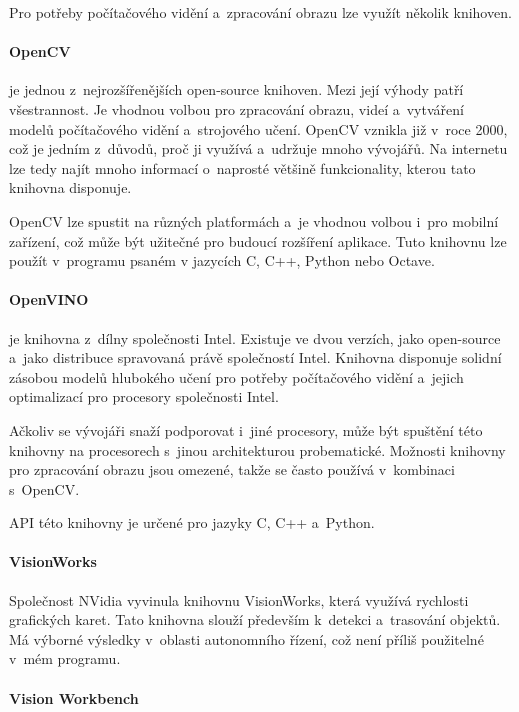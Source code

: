 Pro potřeby počítačového vidění a~zpracování obrazu lze využít několik knihoven.

\paragraph{OpenCV}

 \citep{OpenCV} je jednou z~nejrozšířenějších open-source knihoven. Mezi její výhody patří všestrannost. Je vhodnou volbou pro zpracování obrazu, videí a~vytváření modelů počítačového vidění a~strojového učení. OpenCV vznikla již v~roce 2000, což je jedním z~důvodů, proč ji využívá a~udržuje mnoho vývojářů. Na internetu lze tedy najít mnoho informací o~naprosté většině funkcionality, kterou tato knihovna disponuje.

OpenCV lze spustit na různých platformách a~je vhodnou volbou i~pro mobilní zařízení, což může být užitečné pro budoucí rozšíření aplikace. Tuto knihovnu lze použít v~programu psaném v jazycích C, C++, Python nebo Octave.

\paragraph{OpenVINO}

je knihovna z~dílny společnosti Intel. Existuje ve dvou verzích, jako open-source a~jako distribuce spravovaná právě společností Intel. Knihovna disponuje solidní zásobou modelů hlubokého učení pro potřeby počítačového vidění a~jejich optimalizací pro procesory společnosti Intel.

Ačkoliv se vývojáři snaží podporovat i~jiné procesory, může být spuštění této knihovny na procesorech s~jinou architekturou probematické. Možnosti knihovny pro zpracování obrazu jsou omezené, takže se často používá v~kombinaci s~OpenCV.

API této knihovny je určené pro jazyky C, C++ a~Python.

\paragraph{VisionWorks}

Společnost NVidia vyvinula knihovnu VisionWorks, která využívá rychlosti grafických karet. Tato knihovna slouží především k~detekci a~trasování objektů. Má výborné výsledky v~oblasti autonomního řízení, což není příliš použitelné v~mém programu.

\paragraph{Vision Workbench}

